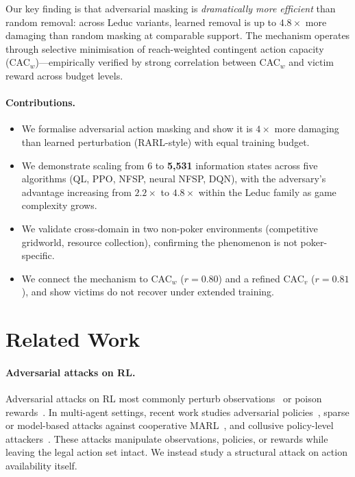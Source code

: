 \documentclass{article}
\begin{document}
Our key finding is that adversarial masking is \emph{dramatically more efficient} than random removal: across Leduc variants, learned removal is up to $4.8\times$ more damaging than random masking at comparable support. The mechanism operates through selective minimisation of reach-weighted contingent action capacity (CAC$_w$)---empirically verified by strong correlation between CAC$_w$ and victim reward across budget levels.

\paragraph{Contributions.}
\begin{itemize}
  \item We formalise adversarial action masking and show it is $4\times$ more damaging than learned perturbation (RARL-style) with equal training budget.
  \item We demonstrate scaling from 6 to \textbf{5,531} information states across five algorithms (QL, PPO, NFSP, neural NFSP, DQN), with the adversary's advantage increasing from $2.2\times$ to $4.8\times$ within the Leduc family as game complexity grows.
  \item We validate cross-domain in two non-poker environments (competitive gridworld, resource collection), confirming the phenomenon is not poker-specific.
  \item We connect the mechanism to CAC$_w$ ($r = 0.80$) and a refined CAC$_v$ ($r = 0.81$), and show victims do not recover under extended training.
\end{itemize}

\section{Related Work}

\paragraph{Adversarial attacks on RL.}
Adversarial attacks on RL most commonly perturb observations~\citep{huang2017adversarial,gleave2020adversarial,zhang2021robust,sun2022who} or poison rewards~\citep{zhang2020adaptive}. In multi-agent settings, recent work studies adversarial policies~\citep{gleave2020adversarial}, sparse or model-based attacks against cooperative MARL~\citep{lin2020marlrobust,hu2022sparse}, and collusive policy-level attackers~\citep{niu2026cama}. These attacks manipulate observations, policies, or rewards while leaving the legal action set intact. We instead study a structural attack on action availability itself.
\end{document}
